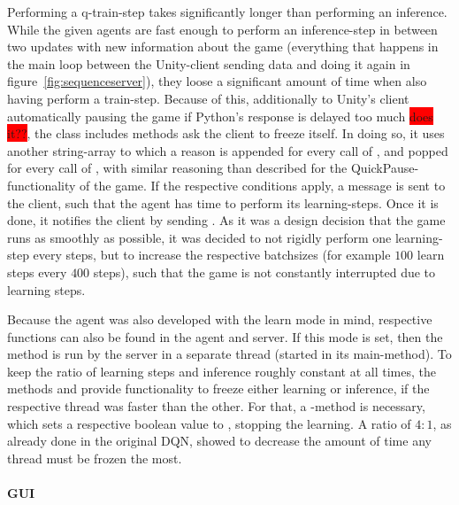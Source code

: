 Performing a q-train-step takes significantly longer than performing an inference. While the given agents are fast enough to perform an inference-step in between two updates with new information about the game (everything that happens in the main loop between the Unity-client sending data and doing it again in figure~\ref{fig:sequenceserver}), they loose a significant amount of time when also having perform a train-step. Because of this, additionally to Unity's client automatically pausing the game if Python's response is delayed too much \colorbox{red}{does it??}, the class  includes methods ask the client to freeze itself. In doing so, it uses another string-array  to which a reason is appended for every call of , and popped for every call of , with similar reasoning than described for the QuickPause-functionality of the game. If the respective conditions apply, a message  is sent to the client, such that the agent has time to perform its learning-steps. Once it is done, it notifies the client by sending . As it was a design decision that the game runs as smoothly as possible, it was decided to not rigidly perform one learning-step every 
 steps, but to increase the respective batchsizes (for example $100$ learn steps every $400$ steps), such that the game is not constantly interrupted due to learning steps. 

Because the agent was also developed with the learn mode  in mind, respective functions can also be found in the agent and server. If this mode is set, then the method  is run by the server in a separate thread (started in its main-method). To keep the ratio of learning steps and inference roughly constant at all times, the methods  and  provide functionality to freeze either learning or inference, if the respective thread was faster than the other. For that, a -method is necessary, which sets a respective boolean value to , stopping the learning. A ratio of $4:1$, as already done in the original DQN, showed to decrease the amount of time any thread must be frozen the most.


\paragraph{GUI}

